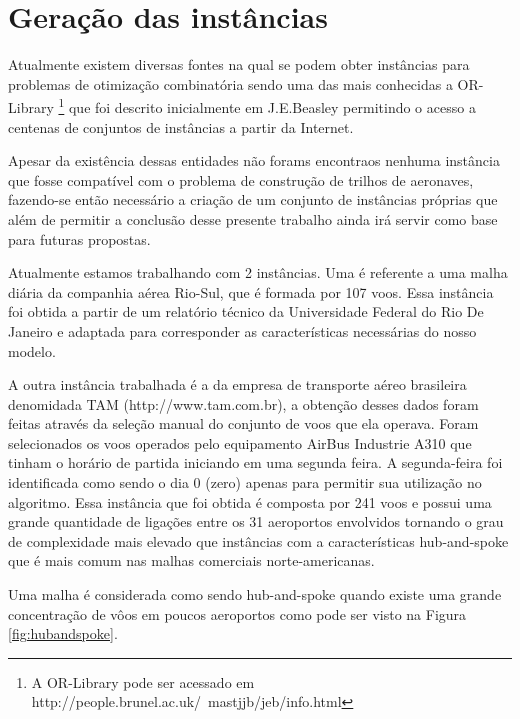 \chapter{Geração das instâncias}
  
	Atualmente existem diversas fontes na qual se podem obter instâncias para problemas de otimização combinatória sendo uma das mais conhecidas a OR-Library \footnote{ A OR-Library pode ser acessado em http://people.brunel.ac.uk/~mastjjb/jeb/info.html} que foi descrito inicialmente em J.E.Beasley \cite{orlibrary} permitindo o acesso a centenas de conjuntos de instâncias a partir da Internet. 
  
	Apesar da existência dessas entidades não forams encontraos nenhuma instância que fosse compatível com o problema de construção de trilhos de aeronaves, fazendo-se então necessário a criação de um conjunto de instâncias próprias que além de permitir a conclusão desse presente trabalho ainda irá servir como base para futuras propostas.
  
 	Atualmente estamos trabalhando com 2 instâncias. Uma é referente a uma malha diária da companhia aérea Rio-Sul, que é formada por 107 voos. Essa instância foi obtida a partir de um relatório técnico da Universidade Federal do Rio De Janeiro \cite{pontes2002} e adaptada para corresponder as características necessárias do nosso modelo. 
 	 	
	A outra instância trabalhada é a da empresa de transporte aéreo brasileira denomidada TAM (http://www.tam.com.br), a obtenção desses  dados foram feitas através da seleção manual do conjunto de voos que ela operava. Foram selecionados os voos operados pelo equipamento AirBus Industrie A310 que tinham o horário de partida iniciando em uma segunda feira. A segunda-feira foi identificada como sendo o dia 0 (zero) apenas para permitir sua utilização no algoritmo. Essa instância que foi obtida é composta por 241 voos e possui uma grande quantidade de ligações entre os 31 aeroportos envolvidos tornando o grau de complexidade mais elevado que instâncias com a características hub-and-spoke que é mais comum nas malhas comerciais norte-americanas. 
	
	Uma malha é considerada como sendo hub-and-spoke quando existe uma grande concentração de vôos em poucos aeroportos como pode ser visto na Figura \ref{fig:hubandspoke}.
	
